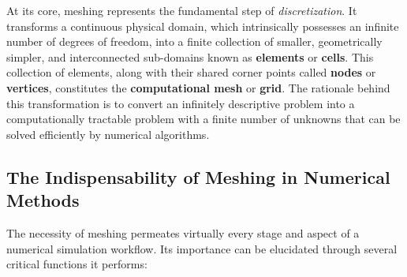 \documentclass{book}
\begin{document}
At its core, meshing represents the fundamental step of \textit{discretization}. It transforms a continuous physical domain, which intrinsically possesses an infinite number of degrees of freedom, into a finite collection of smaller, geometrically simpler, and interconnected sub-domains known as \textbf{elements} or \textbf{cells}. This collection of elements, along with their shared corner points called \textbf{nodes} or \textbf{vertices}, constitutes the \textbf{computational mesh} or \textbf{grid}. The rationale behind this transformation is to convert an infinitely descriptive problem into a computationally tractable problem with a finite number of unknowns that can be solved efficiently by numerical algorithms.

\subsection{The Indispensability of Meshing in Numerical Methods}

The necessity of meshing permeates virtually every stage and aspect of a numerical simulation workflow. Its importance can be elucidated through several critical functions it performs:
\end{document}
